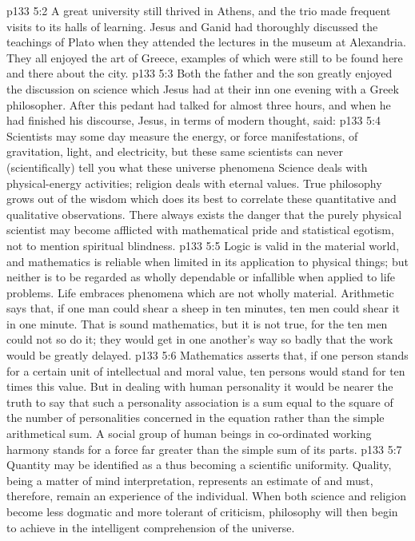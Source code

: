 \vs p133 5:2 A great university still thrived in Athens, and the trio made frequent visits to its halls of learning. Jesus and Ganid had thoroughly discussed the teachings of Plato when they attended the lectures in the museum at Alexandria. They all enjoyed the art of Greece, examples of which were still to be found here and there about the city.
\vs p133 5:3 Both the father and the son greatly enjoyed the discussion on science which Jesus had at their inn one evening with a Greek philosopher. After this pedant had talked for almost three hours, and when he had finished his discourse, Jesus, in terms of modern thought, said:
\pc \vs p133 5:4 Scientists may some day measure the energy, or force manifestations, of gravitation, light, and electricity, but these same scientists can never (scientifically) tell you what these universe phenomena  Science deals with physical\hyp{}energy activities; religion deals with eternal values. True philosophy grows out of the wisdom which does its best to correlate these quantitative and qualitative observations. There always exists the danger that the purely physical scientist may become afflicted with mathematical pride and statistical egotism, not to mention spiritual blindness.\plusone
\vs p133 5:5 Logic is valid in the material world, and mathematics is reliable when limited in its application to physical things; but neither is to be regarded as wholly dependable or infallible when applied to life problems. Life embraces phenomena which are not wholly material. Arithmetic says that, if one man could shear a sheep in ten minutes, ten men could shear it in one minute. That is sound mathematics, but it is not true, for the ten men could not so do it; they would get in one another’s way so badly that the work would be greatly delayed.
\vs p133 5:6 Mathematics asserts that, if one person stands for a certain unit of intellectual and moral value, ten persons would stand for ten times this value. But in dealing with human personality it would be nearer the truth to say that such a personality association is a sum equal to the square of the number of personalities concerned in the equation rather than the simple arithmetical sum. A social group of human beings in co\hyp{}ordinated working harmony stands for a force far greater than the simple sum of its parts.
\vs p133 5:7 Quantity may be identified as a  thus becoming a scientific uniformity. Quality, being a matter of mind interpretation, represents an estimate of  and must, therefore, remain an experience of the individual. When both science and religion become less dogmatic and more tolerant of criticism, philosophy will then begin to achieve  in the intelligent comprehension of the universe.
